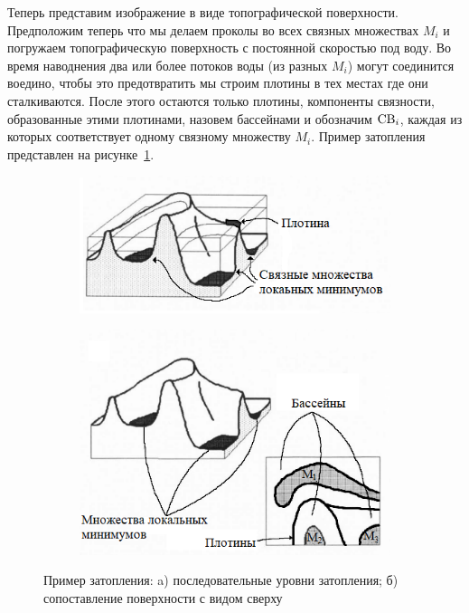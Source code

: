 \documentclass[14pt, a4paper]{extreport}
\begin{document}
	Теперь представим изображение в виде топографической поверхности. Предположим теперь что мы делаем проколы во всех связных множествах $M_i$ и погружаем топографическую поверхность с постоянной скоростью под воду. Во время наводнения два или более потоков воды (из разных $M_i$) могут соединится воедино, чтобы это предотвратить мы строим плотины в тех местах где они сталкиваются. После этого остаются только плотины, компоненты связности, образованные этими плотинами, назовем бассейнами и обозначим $\textup{CB}_i$, каждая из которых соответствует одному связному множеству $M_i$. Пример затопления представлен на рисунке~\ref{fig:potop_watershed}.
	\begin{figure}[h!]
		\begin{subfigure}{.49\textwidth}
			\centering
			\includegraphics[width = \textwidth]{image/chapter_3/potop1_watershed}
			\caption{}
		\end{subfigure}
		\begin{subfigure}{.49\textwidth}
			\centering
			\includegraphics[width = \textwidth]{image/chapter_3/potop2_watershed}
			\caption{}
		\end{subfigure}
		\centering
		\caption{Пример затопления: a) последовательные уровни затопления; б) сопоставление поверхности с видом сверху}
		\label{fig:potop_watershed}
	\end{figure}
	
\end{document}
